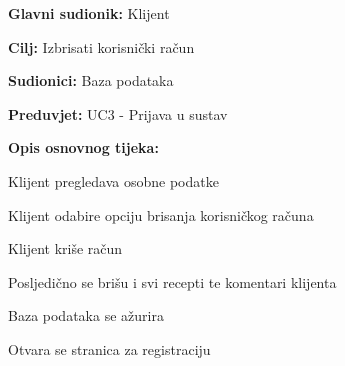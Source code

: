 					\noindent {}
					\begin{packed_item}
	
						\item \textbf{Glavni sudionik: } Klijent
						\item  \textbf{Cilj:} Izbrisati korisnički račun
						\item  \textbf{Sudionici:} Baza podataka
						\item  \textbf{Preduvjet:} UC3 - Prijava u sustav
						\item  \textbf{Opis osnovnog tijeka:}
						
						\item[] \begin{packed_enum}
	
							\item Klijent pregledava osobne podatke
							\item Klijent odabire opciju brisanja korisničkog računa
							\item Klijent kriše račun
							\item Posljedično se brišu i svi recepti te komentari klijenta
							\item Baza podataka se ažurira
							\item Otvara se stranica za registraciju
						
						\end{packed_enum}
					\end{packed_item}

